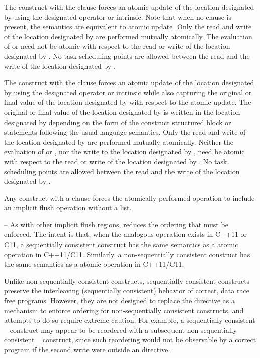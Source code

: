 {{{{The  construct with the  clause forces an atomic update of the location 
designated by  using the designated operator or intrinsic. Note that when no clause is 
present, the semantics are equivalent to atomic update. Only the read and write of the 
location designated by  are performed mutually atomically. The evaluation of  or 
 need not be atomic with respect to the read or write of the location designated 
by . No task scheduling points are allowed between the read and the write of the 
location designated by .

The  construct with the  clause forces an atomic update of the 
location designated by  using the designated operator or intrinsic while also capturing 
the original or final value of the location designated by  with respect to the atomic 
update. The original or final value of the location designated by  is written in the 
location designated by  depending on the form of the  construct structured 
block or statements following the usual language semantics. Only the read and write of 
the location designated by  are performed mutually atomically. Neither the evaluation 
of  or , nor the write to the location designated by , need be atomic with
respect to the read or write of the location designated by . No task scheduling points 
are allowed between the read and the write of the location designated by .

Any  construct with a  clause forces the atomically performed 
operation to include an implicit flush operation without a list.

\notestart
\noteheader – As with other implicit flush regions, 
reduces the 
ordering that must be enforced. The intent is that, when the analogous operation exists 
in C++11 or C11, a sequentially consistent  construct has the same semantics as 
a  atomic operation in C++11/C11. Similarly, a 
non-sequentially consistent  construct has the same semantics as a 
 atomic operation in C++11/C11.

Unlike non-sequentially consistent  constructs, sequentially consistent  
constructs preserve the interleaving (sequentially consistent) behavior of correct, 
data race free programs. However, they are not designed to replace the  directive 
as a mechanism to enforce ordering for non-sequentially consistent  constructs, 
and attempts to do so require extreme caution. For example, a sequentially consistent 
~ construct may appear to be reordered with a subsequent 
non-sequentially consistent ~ construct, since such reordering would not 
be observable by a correct program if the second write were outside an  
directive.
\noteend

}}}}
